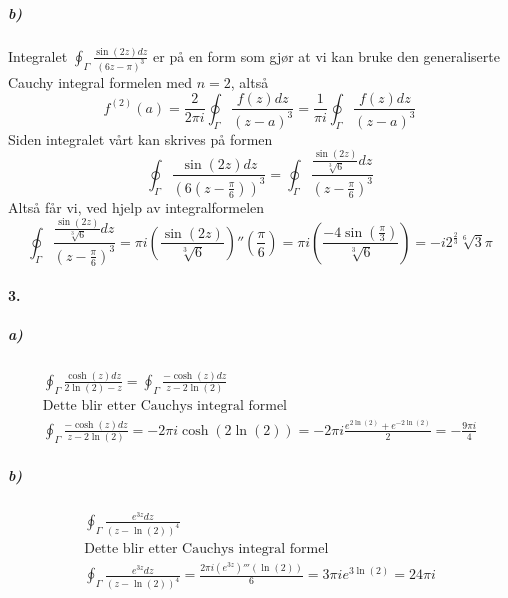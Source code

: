 \documentclass[11pt, A4paper,norsk]{article}
\begin{document}
			\subparagraph{b)}
				\begin{flushleft}
Integralet $\oint_{\Gamma} \frac{\sin(2z)dz}{(6z - \pi)^3}$ er på en form som gjør at vi kan bruke den generaliserte Cauchy integral formelen med $n = 2$, altså
$$f^{(2)}(a) = \frac{2}{2 \pi i} \oint_{\Gamma} \frac{f(z) dz}{(z - a)^{3}} = \frac{1}{\pi i} \oint_{\Gamma} \frac{f(z) dz}{(z - a)^{3}}$$
Siden integralet vårt kan skrives på formen
$$\oint_{\Gamma} \frac{\sin(2z)dz}{\left( 6 \left(z - \frac{\pi}{6} \right) \right)^3} = \oint_{\Gamma} \frac{\frac{\sin(2z)}{\sqrt[3]{6}}dz}{\left(z - \frac{\pi}{6} \right)^3}$$
Altså får vi, ved hjelp av integralformelen
$$\oint_{\Gamma} \frac{\frac{\sin(2z)}{\sqrt[3]{6}}dz}{\left(z - \frac{\pi}{6} \right)^3} = \pi i \left( \frac{\sin(2z)}{\sqrt[3]{6}} \right)''\left( \frac{\pi}{6} \right) = \pi i \left( \frac{- 4 \sin\left( \frac{\pi}{3} \right)}{\sqrt[3]{6}} \right) = - i 2^{\frac{2}{3}} \sqrt[6]{3} \pi $$
				\end{flushleft}








		\paragraph{3.}
			\subparagraph{a)}
				\begin{gather*}
\oint_{\Gamma} \frac{\cosh(z)dz}{2 \ln (2) - z} = \oint_{\Gamma} \frac{- \cosh(z)dz}{z - 2 \ln (2)} \\
\text{Dette blir etter Cauchys integral formel} \\
\oint_{\Gamma} \frac{- \cosh(z)dz}{z - 2 \ln (2)} = - 2 \pi i \cosh(2 \ln(2)) = - 2 \pi i \frac{e^{2 \ln(2)} + e^{-2 \ln(2)}}{2} = - \frac{9 \pi i}{4}
				\end{gather*}









			\subparagraph{b)}
				\begin{gather*}
\oint_{\Gamma} \frac{e^{3z}dz}{\left( z - \ln(2) \right)^4} \\
\text{Dette blir etter Cauchys integral formel} \\
\oint_{\Gamma} \frac{e^{3z}dz}{\left( z - \ln(2) \right)^4} = \frac{2 \pi i \left( e^{3z} \right)'''(\ln(2))}{6} = 3 \pi i e^{3 \ln(2)} = 24 \pi i
				\end{gather*}
\end{document}
